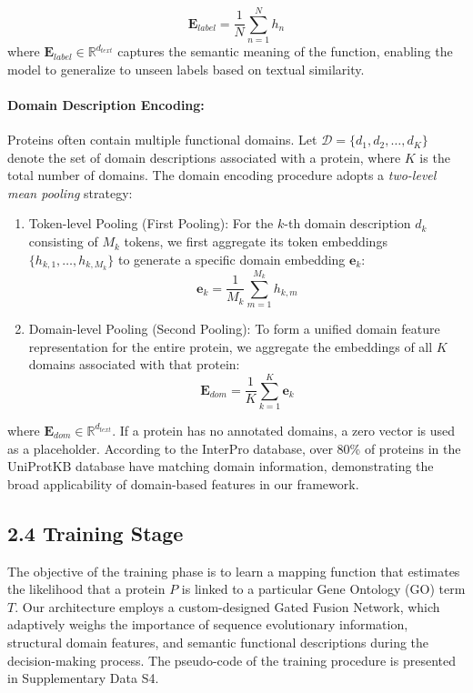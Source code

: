 \documentclass[unnumsec,webpdf,contemporary,large]{oup-authoring-template}%
\theoremstyle{thmstyleone}%
\theoremstyle{thmstyletwo}%
\theoremstyle{thmstylethree}%
\begin{document}
\begin{equation}
    \mathbf{E}_{label} = \frac{1}{N} \sum_{n=1}^{N} h_n
\end{equation}
where $\mathbf{E}_{label} \in \mathbb{R}^{d_{text}}$ captures the semantic meaning of the function, enabling the model to generalize to unseen labels based on textual similarity.

\paragraph{Domain Description Encoding:}
Proteins often contain multiple functional domains. Let $\mathcal{D} = \{d_1, d_2, \dots, d_K\}$ denote the set of domain descriptions associated with a protein, where $K$ is the total number of domains. The domain encoding procedure adopts a \textit{two-level mean pooling} strategy:
\begin{enumerate}
    \item Token-level Pooling (First Pooling): For the $k$-th domain description $d_k$ consisting of $M_k$ tokens, we first aggregate its token embeddings $\{h_{k,1}, \dots, h_{k,M_k}\}$ to generate a specific domain embedding $\mathbf{e}_k$:
    \begin{equation}
        \mathbf{e}_k = \frac{1}{M_k} \sum_{m=1}^{M_k} h_{k,m}
    \end{equation}

    \item Domain-level Pooling (Second Pooling): To form a unified domain feature representation for the entire protein, we aggregate the embeddings of all $K$ domains associated with that protein:
    \begin{equation}
        \mathbf{E}_{dom} = \frac{1}{K} \sum_{k=1}^{K} \mathbf{e}_k
    \end{equation}
\end{enumerate}
where $\mathbf{E}_{dom} \in \mathbb{R}^{d_{text}}$. If a protein has no annotated domains, a zero vector is used as a placeholder. According to the InterPro database\citep{blum2025interpro}, over 80\% of proteins in the UniProtKB database\citep{uniprot2025uniprot} have matching domain information, demonstrating the broad applicability of domain-based features in our framework.

\subsection{2.4 Training Stage}
The objective of the training phase is to learn a mapping function that estimates the likelihood that a protein $P$ is linked to a particular Gene Ontology (GO) term $T$. Our architecture employs a custom-designed Gated Fusion Network, which adaptively weighs the importance of sequence evolutionary information, structural domain features, and semantic functional descriptions during the decision-making process. The pseudo-code of the training procedure is presented in Supplementary Data S4.
\end{document}
